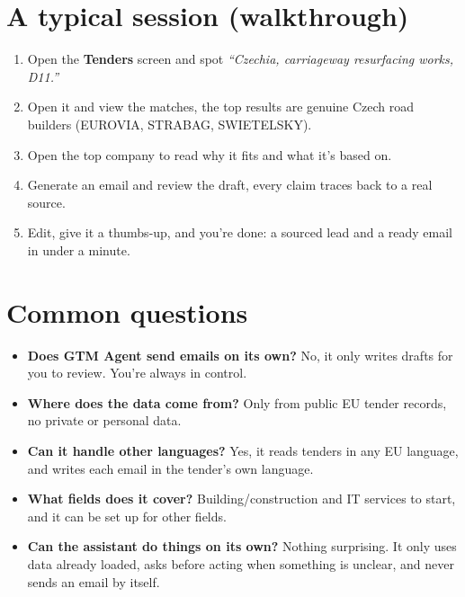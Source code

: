 \section{A typical session (walkthrough)}\label{a-typical-session}

\begin{enumerate}
\def\labelenumi{\arabic{enumi}.}
\tightlist
\item
  Open the \textbf{Tenders} screen and spot \emph{``Czechia, carriageway
  resurfacing works, D11.''}
\item
  Open it and view the matches, the top results are genuine Czech road builders
  (EUROVIA, STRABAG, SWIETELSKY).
\item
  Open the top company to read why it fits and what it's based on.
\item
  Generate an email and review the draft, every claim traces back to a real
  source.
\item
  Edit, give it a thumbs-up, and you're done: a sourced lead and a ready email in
  under a minute.
\end{enumerate}

\section{Common questions}\label{faq}
\begin{itemize}
\tightlist
\item
  \textbf{Does GTM Agent send emails on its own?} No, it only writes drafts for you
to review. You're always in control.
\item
  \textbf{Where does the data come from?} Only from public EU tender records, no
private or personal data.
\item
  \textbf{Can it handle other languages?} Yes, it reads tenders in any EU language,
and writes each email in the tender's own language.
\item
  \textbf{What fields does it cover?} Building/construction and IT services to start,
and it can be set up for other fields.
\item
  \textbf{Can the assistant do things on its own?} Nothing surprising. It only uses
data already loaded, asks before acting when something is unclear, and never sends
an email by itself.
\end{itemize}


